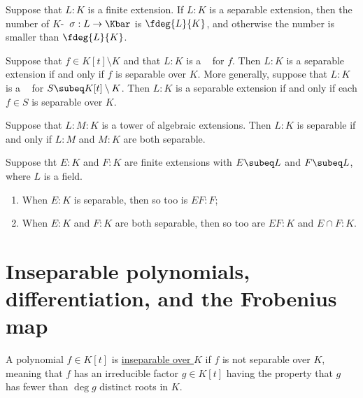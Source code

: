 \documentclass{article}
\begin{document}
  \begin{tcorollary}
    Suppose that \( L:K \) is a finite extension.
    If \( L:K \) is a separable extension, then the number of \( K \)-\homo~\( \sigma:L\to\Kbar \) is \( \fdeg{L}{K} \), and otherwise the number is smaller than \( \fdeg{L}{K} \).
  \end{tcorollary}

  \begin{tcorollary}
    Suppose that \( f\in K[t]\setminus K \) and that \( L:K \) is a \sfe~ for \( f \).
    Then \( L:K \) is a separable extension if and only if \( f \) is separable over \( K \).
    More generally, suppose that \( L:K \) is a \sfe~ for \( S\subeq K[t]\setminus K \).
    Then \( L:K \) is a separable extension if and only if each \( f\in S \) is separable over \( K \).
  \end{tcorollary}

  \begin{ttheorem}
    Suppose that \( L:M:K \) is a tower of algebraic extensions.
    Then \( L:K \) is separable if and only if \( L:M \) and \( M:K \) are both separable.
  \end{ttheorem}

  \begin{ttheorem}
    Suppose tht \( E:K \) and \( F:K \) are finite extensions with \( E\subeq L \) and \( F\subeq L \), where \( L \) is a field.
    \begin{enumerate}[label=(\alph*)]
      \item When \( E:K \) is separable, then so too is \( EF:F \);
      \item When \( E:K \) and \( F:K \) are both separable, then so too are \( EF:K \) and \( E\cap F:K \).
    \end{enumerate}
  \end{ttheorem}

\section{Inseparable polynomials, differentiation, and the Frobenius map}
  \begin{tdefinition}[Inseparable]
    A polynomial \( f \in K[t] \) is \ul{inseparable over \( K \)} if \( f \) is not separable over \( K \), meaning that \( f \) has an irreducible factor \( g \in K[t] \) having the property that \( g \) has fewer than \( \deg g \) distinct roots in \( K \).
  \end{tdefinition}
\end{document}
